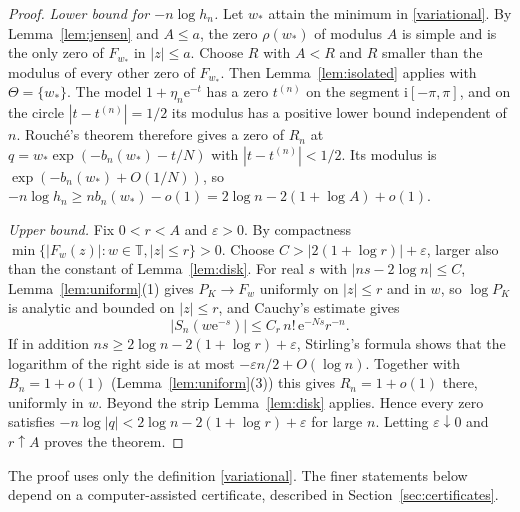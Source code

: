\documentclass[11pt,a4paper]{article}
\theoremstyle{remark}
\newcommand{\T}{\mathbb T}
\newcommand{\e}{\mathrm e}
\newcommand{\ii}{\mathrm i}
\begin{document}
\begin{proof}
\emph{Lower bound for $-n\log h_n$.} Let $w_*$ attain the minimum in \eqref{variational}. By Lemma~\ref{lem:jensen} and $A\le a$, the zero $\rho(w_*)$ of modulus $A$ is simple and is the only zero of $F_{w_*}$ in $|z|\le a$. Choose $R$ with $A<R$ and $R$ smaller than the modulus of every other zero of $F_{w_*}$. Then Lemma~\ref{lem:isolated} applies with $\Theta=\{w_*\}$. The model $1+\eta_n\e^{-t}$ has a zero $t^{(n)}$ on the segment $\ii[-\pi,\pi]$, and on the circle $|t-t^{(n)}|=1/2$ its modulus has a positive lower bound independent of $n$. Rouch\'e's theorem therefore gives a zero of $R_n$ at $q=w_*\exp(-b_n(w_*)-t/N)$ with $|t-t^{(n)}|<1/2$. Its modulus is $\exp(-b_n(w_*)+O(1/N))$, so $-n\log h_n\ge nb_n(w_*)-o(1)=2\log n-2(1+\log A)+o(1)$.

\emph{Upper bound.} Fix $0<r<A$ and $\varepsilon>0$. By compactness $\min\{|F_w(z)|:w\in\T,|z|\le r\}>0$. Choose $C>|2(1+\log r)|+\varepsilon$, larger also than the constant of Lemma~\ref{lem:disk}. For real $s$ with $|ns-2\log n|\le C$, Lemma~\ref{lem:uniform}(1) gives $P_K\to F_w$ uniformly on $|z|\le r$ and in $w$, so $\log P_K$ is analytic and bounded on $|z|\le r$, and Cauchy's estimate gives
\[
|S_n(w\e^{-s})|\le C_r\,n!\,\e^{-Ns}r^{-n}.
\]
If in addition $ns\ge2\log n-2(1+\log r)+\varepsilon$, Stirling's formula shows that the logarithm of the right side is at most $-\varepsilon n/2+O(\log n)$. Together with $B_n=1+o(1)$ (Lemma~\ref{lem:uniform}(3)) this gives $R_n=1+o(1)$ there, uniformly in $w$. Beyond the strip Lemma~\ref{lem:disk} applies. Hence every zero satisfies $-n\log|q|<2\log n-2(1+\log r)+\varepsilon$ for large $n$. Letting $\varepsilon\downarrow0$ and $r\uparrow A$ proves the theorem.
\end{proof}

The proof uses only the definition \eqref{variational}. The finer statements below depend on a computer-assisted certificate, described in Section~\ref{sec:certificates}.
\end{document}
